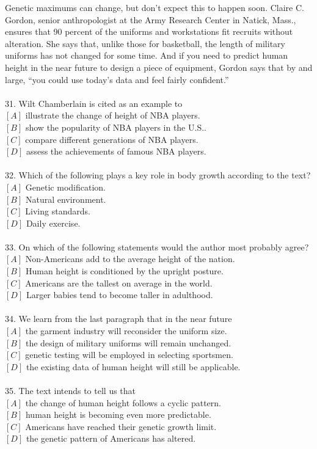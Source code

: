 \documentclass[a4paper]{ctexart}
\begin{document}
\par
Genetic maximums can change, but don’t expect this to happen soon. Claire C. Gordon, senior anthropologist at the Army Research Center in Natick, Mass., ensures that 90 percent of the uniforms and workstations fit recruits without alteration. She says that, unlike those for basketball, the length of military uniforms has not changed for some time. And if you need to predict human height in the near future to design a piece of equipment, Gordon says that by and large, “you could use today’s data and feel fairly confident.”
\\\\
31.	Wilt Chamberlain is cited as an example to\\
$[A]$ illustrate the change of height of NBA players.\\
$[B]$ show the popularity of NBA players in the U.S..\\
$[C]$ compare different generations of NBA players.\\
$[D]$ assess the achievements of famous NBA players.\\
\\
32.	Which of the following plays a key role in body growth according to the text?\\
$[A]$ Genetic modification.\\
$[B]$ Natural environment.\\
$[C]$ Living standards.\\
$[D]$ Daily exercise.\\
\\
33.	On which of the following statements would the author most probably agree?\\
$[A]$ Non-Americans add to the average height of the nation.\\
$[B]$ Human height is conditioned by the upright posture.\\
$[C]$ Americans are the tallest on average in the world.\\
$[D]$ Larger babies tend to become taller in adulthood.\\
\\
34.	We learn from the last paragraph that in the near future\\
$[A]$ the garment industry will reconsider the uniform size.\\
$[B]$ the design of military uniforms will remain unchanged.\\
$[C]$ genetic testing will be employed in selecting sportsmen.\\
$[D]$ the existing data of human height will still be applicable.\\
\\
35.	The text intends to tell us that\\
$[A]$ the change of human height follows a cyclic pattern.\\
$[B]$ human height is becoming even more predictable.\\
$[C]$ Americans have reached their genetic growth limit.\\
$[D]$ the genetic pattern of Americans has altered.\\
\end{document}
